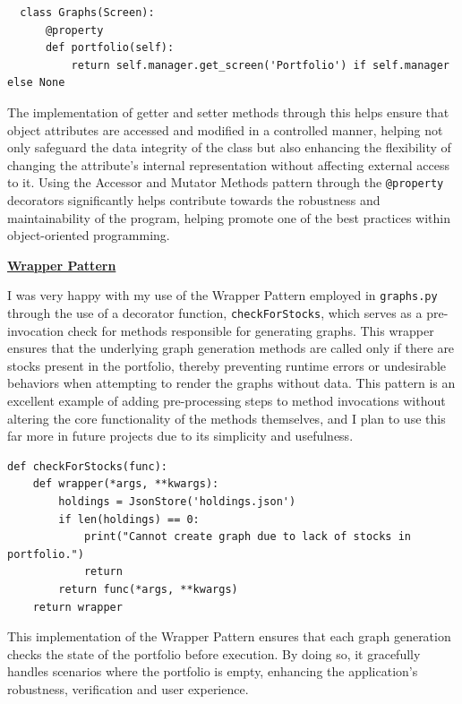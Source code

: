 \documentclass{article}
\begin{document}
\begin{verbatim}
  class Graphs(Screen):
      @property
      def portfolio(self):
          return self.manager.get_screen('Portfolio') if self.manager else None
\end{verbatim}

\vspace{0.3cm}
The implementation of getter and setter methods through this helps ensure that object attributes are accessed and modified in a controlled manner, helping not only safeguard the data integrity of the class but also enhancing the flexibility of changing the attribute's internal representation without affecting external access to it. Using the Accessor and Mutator Methods pattern through the \texttt{@property} decorators significantly helps contribute towards the robustness and maintainability of the program, helping promote one of the best practices within object-oriented programming.\\\vspace{0.3cm}


\underline{\textbf{Wrapper Pattern}}\\\vspace{0.3cm}

I was very happy with my use of the Wrapper Pattern employed in \texttt{graphs.py} through the use of a decorator function, \texttt{checkForStocks}, which serves as a pre-invocation check for methods responsible for generating graphs. This wrapper ensures that the underlying graph generation methods are called only if there are stocks present in the portfolio, thereby preventing runtime errors or undesirable behaviors when attempting to render the graphs without data. This pattern is an excellent example of adding pre-processing steps to method invocations without altering the core functionality of the methods themselves, and I plan to use this far more in future projects due to its simplicity and usefulness.\\\vspace{0.3cm}

\begin{verbatim}
def checkForStocks(func):
    def wrapper(*args, **kwargs):
        holdings = JsonStore('holdings.json')
        if len(holdings) == 0:
            print("Cannot create graph due to lack of stocks in portfolio.")
            return
        return func(*args, **kwargs)
    return wrapper
\end{verbatim}

\vspace{0.3cm}
This implementation of the Wrapper Pattern ensures that each graph generation checks the state of the portfolio before execution. By doing so, it gracefully handles scenarios where the portfolio is empty, enhancing the application's robustness, verification and user experience.\\\vspace{0.3cm}
\end{document}

